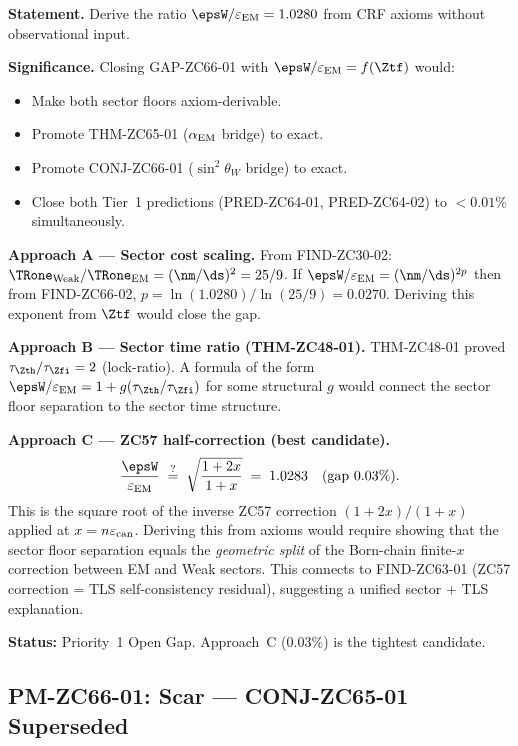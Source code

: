 \documentclass[12pt, a4paper]{article}
\renewcommand{\epsEM}{\varepsilon_{\rm EM}}
\renewcommand{\epscan}{\varepsilon_{\rm can}}
\renewcommand{\swsq}{\sin^2\!\theta_W}
\renewcommand{\aEM}{\alpha_{\rm EM}}
\begin{document}
\begin{openqbox}[title={GAP-ZC66-01: Algebraic Origin of
  $\epsW/\epsEM = 1.0280$ from Axioms (Priority~1)}]
\textbf{Statement.}
Derive the ratio $\epsW/\epsEM = 1.0280$ from CRF axioms
without observational input.

\textbf{Significance.}
Closing GAP-ZC66-01 with $\epsW/\epsEM = f(\Ztf)$ would:
\begin{itemize}[leftmargin=2em, noitemsep]
  \item Make both sector floors axiom-derivable.
  \item Promote THM-ZC65-01 ($\aEM$ bridge) to exact.
  \item Promote CONJ-ZC66-01 ($\swsq$ bridge) to exact.
  \item Close both Tier~1 predictions
    (PRED-ZC64-01, PRED-ZC64-02) to $<0.01\%$ simultaneously.
\end{itemize}

\textbf{Approach A --- Sector cost scaling.}
From FIND-ZC30-02: $\TRone_{\rm Weak}/\TRone_{\rm EM} = (\nm/\ds)^{2} = 25/9$.
If $\epsW/\epsEM = (\nm/\ds)^{2p}$ then from FIND-ZC66-02,
$p = \ln(1.0280)/\ln(25/9) = 0.0270$.
Deriving this exponent from $\Ztf$ would close the gap.

\textbf{Approach B --- Sector time ratio (THM-ZC48-01).}
THM-ZC48-01 proved $\tau_{\Zth}/\tau_{\Zfi} = 2$ (lock-ratio).
A formula of the form
$\epsW/\epsEM = 1 + g(\tau_{\Zth}/\tau_{\Zfi})$
for some structural $g$ would connect the sector floor
separation to the sector time structure.

\textbf{Approach C --- ZC57 half-correction (best candidate).}
\[
  \frac{\epsW}{\epsEM}
  \;\stackrel{?}{=}\;
  \sqrt{\frac{1+2x}{1+x}}
  \;=\; 1.0283
  \quad\text{(gap }0.03\%).
\]
This is the square root of the inverse ZC57 correction
$(1+2x)/(1+x)$ applied at $x = n\epscan$.
Deriving this from axioms would require showing that
the sector floor separation equals the \emph{geometric split}
of the Born-chain finite-$x$ correction between EM and Weak sectors.
This connects to FIND-ZC63-01 (ZC57 correction = TLS self-consistency
residual), suggesting a unified sector + TLS explanation.

\textbf{Status:} Priority~1 Open Gap.
Approach~C ($0.03\%$) is the tightest candidate.
\end{openqbox}

\subsection{PM-ZC66-01: Scar --- CONJ-ZC65-01 Superseded}
\label{sec:pm}
\end{document}
